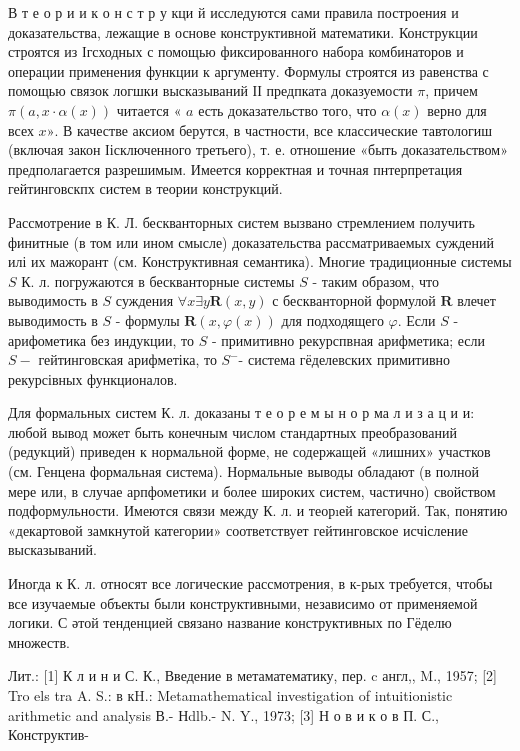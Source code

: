 \documentclass[10pt]{article}
\begin{document}
В т е о р и и к о н с т р у кци й исследуются сами правила построения и доказательства, лежащие в основе конструктивной математики. Конструкции строятся из Ігсходных с помощью фиксированного набора комбинаторов и операции применения функции к аргументу. Формулы строятся из равенства с помощью связок логшки высказываний ІІ предпката доказуемости $\pi$, причем $\pi(a, x \cdot \alpha(x))$ читается « $a$ есть доказательство того, что $\alpha(x)$ верно для всех $x »$. В качестве аксиом берутся, в частности, все классические тавтологиш (включая закон Іісключенного третьего), т. е. отношение «быть доказательством» предполагается разрешимым. Имеется корректная и точная пнтерпретация гейтинговскпх систем в теории конструкций.



Рассмотрение в К. Л. бескванторных систем вызвано стремлением получить финитные (в том или ином смысле) доказательства рассматриваемых суждений илі их мажорант (см. Конструктивная семантика). Многие традиционные системы $S$ К. л. погружаются в бескванторные системы $S$ - таким образом, что выводимость в $S$ суждения $\forall x \exists y \boldsymbol{R}(x, y)$ с бескванторной формулой $\boldsymbol{R}$ влечет выводимость в $S$ - формулы $\boldsymbol{R}(x, \varphi(x))$ для подходящего $\varphi$. Если $S$ - арифометика без индукции, то $S$ - примитивно рекурспвная арифметика; если $S-$ гейтинговская арифметіка, то $S^{-}$- система гёделевских примитивно рекурсівных функционалов.



Для формальных систем К. л. доказаны т е о р е м ы н о р ма л и з а ц и и: любой вывод может быть конечным числом стандартных преобразований (редукций) приведен к нормальной форме, не содержащей «лишних» участков (см. Генцена формальная система). Нормальные выводы обладают (в полной мере или, в случае арпфометики и более широких систем, частично) свойством подформульности. Имеются связи между К. л. и теорıей категорий. Так, понятию «декартовой замкнутой категории» соответствует гейтинговское исчісление высказываний.



Иногда к К. л. относят все логические рассмотрения, в к-рых требуется, чтобы все изучаемые объекты были конструктивными, независимо от применяемой логики. С әтой тенденцией связано название конструктивных по Гёделю множеств.



Лит.: [1] К л и н и С. К., Введение в метаматематику, пер. c англ,, M., 1957; [2] Tro els tra A. S.: в кH.: Metamathematical investigation of intuitionistic arithmetic and analysis В.- Нdlb.- N. Y., 1973; [3] Н о в и к о в П. С., Конструктив-
\end{document}
